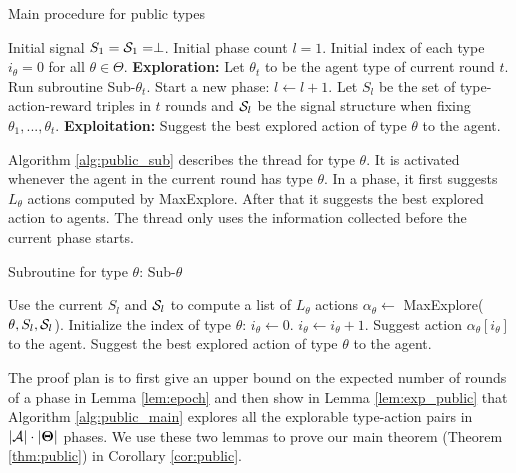  \begin{algorithm}[H]
    \caption{Main procedure for public types }
    	\label{alg:public_main}
    \begin{algorithmic}[1]
    	\STATE Initial signal $S_1 = \S_1 = \perp$.
	\STATE Initial phase count $l = 1$.
	\STATE Initial index of each type $i_{\theta} = 0$ for all $\theta \in \varTheta$.
			\STATE \textbf{Exploration:}
			\STATE Let $\theta_t$ to be the agent type of current round $t$. Run subroutine Sub-$\theta_t$.
				\STATE Start a new phase:
				\STATE $l \leftarrow l + 1$.
				\STATE Let $S_l$ be the set of type-action-reward triples in $t$ rounds and $\S_l$ be the signal structure when fixing $\theta_1,...,\theta_t$.
			\ENDIF
		\ELSE
			\STATE \textbf{Exploitation:}
			\STATE Suggest the best explored action of type $\theta$ to the agent.
		\ENDIF
	\ENDFOR
     \end{algorithmic}
\end{algorithm}

Algorithm \ref{alg:public_sub} describes the thread for type $\theta$. It is activated whenever the agent in the current round has type $\theta$. In a phase, it first suggests $L_{\theta}$ actions computed by MaxExplore. After that it suggests the best explored action to agents. The thread only uses the information collected before the current phase starts.

 \begin{algorithm}[H]
    \caption{Subroutine for type $\theta$: Sub-$\theta$ }
    	\label{alg:public_sub}
    \begin{algorithmic}[1]
			\STATE Use the current $S_l$ and $\S_l$ to compute a list of $L_{\theta}$ actions $\alpha_{\theta} \leftarrow $ MaxExplore($\theta, S_l, \S_l$).
			\STATE Initialize the index of type $\theta$: $i_{\theta} \leftarrow 0$.
		\ENDIF
		\STATE $i_{\theta} \leftarrow i_{\theta} + 1$.
			\STATE Suggest action $\alpha_{\theta} [i_{\theta}]$ to the agent.
		\ELSE
			\STATE Suggest the best explored action of type $\theta$ to the agent.
		\ENDIF
	\ENDFOR
     \end{algorithmic}
\end{algorithm}


The proof plan is to first give an upper bound on the expected number of rounds of a phase in Lemma \ref{lem:epoch} and then show in Lemma \ref{lem:exp_public} that Algorithm \ref{alg:public_main} explores all the explorable type-action pairs in $|\A| \cdot |\varTheta|$ phases. We use these two lemmas to prove our main theorem (Theorem \ref{thm:public}) in Corollary \ref{cor:public}.

